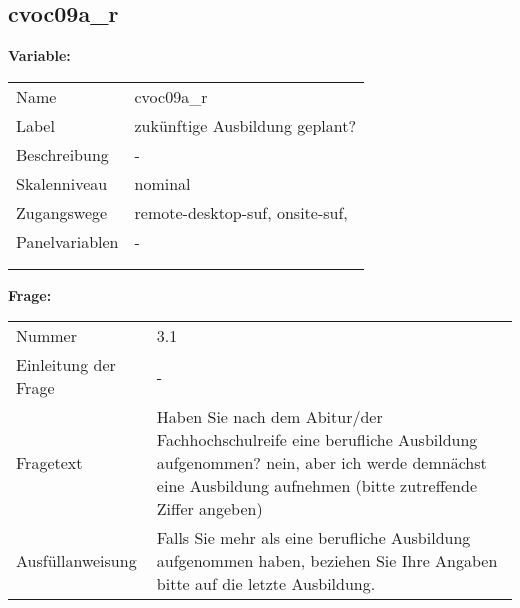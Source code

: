 	
	
	\subsection{cvoc09a\_r}
	\label{subSection:cvoc09a_r}

	\noindent\textbf{Variable:}\\
		\begin{tabular}{lL{11.3cm}}
			\label{tableVariable:cvoc09a_r}
			Name & cvoc09a\_r \\
			Label & zukünftige Ausbildung geplant? \\
			Beschreibung & - \\
			Skalenniveau & nominal \\
			Zugangswege &
				remote-desktop-suf,
				onsite-suf,
 \\
			Panelvariablen & -
			 \\
			 \\
 \\
		\end{tabular}

		\vspace*{1 cm}
		\noindent\textbf{Frage:}\\
		\begin{tabular}{lL{11.3cm}}
			\label{tableQuestion:cvoc09a_r}
			Nummer & 3.1 \\
			Einleitung der Frage & - \\
			Fragetext & Haben Sie nach dem Abitur/der Fachhochschulreife eine berufliche Ausbildung aufgenommen?
nein, aber ich werde demnächst eine Ausbildung aufnehmen
(bitte zutreffende Ziffer angeben) \\
			Ausfüllanweisung & Falls Sie mehr als eine berufliche Ausbildung aufgenommen haben, beziehen Sie Ihre Angaben bitte auf die letzte Ausbildung. \\
		\end{tabular}





